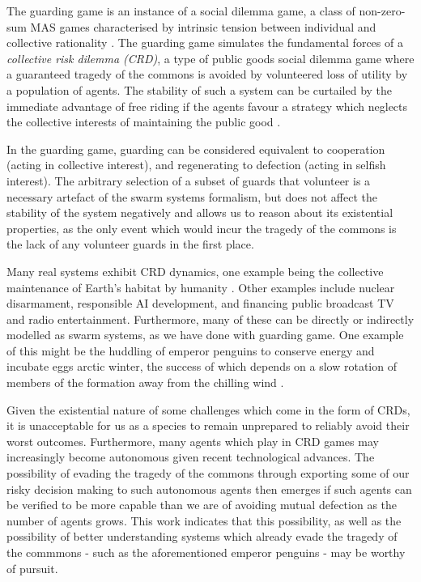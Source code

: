 The guarding game is an instance of a social dilemma game, a class of
non-zero-sum MAS games characterised by intrinsic tension between individual
and collective rationality \cite{VanlangeJPV13}. The guarding game simulates
the fundamental forces of a \emph{collective risk dilemma (CRD)}, a type of
public goods social dilemma game where a guaranteed tragedy of the commons
\cite{Hardin68} is avoided by volunteered loss of utility by a population of
agents. The stability of such a system can be curtailed by the immediate
advantage of free riding if the agents favour a strategy which neglects the
collective interests of maintaining the public good \cite{SantosP11}.

In the guarding game, guarding can be considered equivalent to cooperation
(acting in collective interest), and regenerating to defection (acting in
selfish interest). The arbitrary selection of a subset of guards that volunteer
is a necessary artefact of the swarm systems formalism, but does not affect the
stability of the system negatively and allows us to reason about its
existential properties, as the only event which would incur the tragedy of the
commons is the lack of any volunteer guards in the first place.

Many real systems exhibit CRD dynamics, one example being the collective
maintenance of Earth's habitat by humanity \cite{Smirnov19}. Other examples
include nuclear disarmament, responsible AI development, and financing public
broadcast TV and radio entertainment. Furthermore, many of these can be
directly or indirectly modelled as swarm systems, as we have done with guarding
game. One example of this might be the huddling of emperor penguins to conserve
energy and incubate eggs \cite{GilbertRLNA06}
arctic winter, the success of which depends on a slow rotation of members of
the formation away from the chilling wind \cite{WatersBK12}.

Given the existential nature of some challenges which come in the form of CRDs,
it is unacceptable for us as a species to remain unprepared to reliably avoid
their worst outcomes. Furthermore, many agents which play in CRD games may
increasingly become autonomous given recent technological advances. The
possibility of evading the tragedy of the commons through exporting some of our
risky decision making to such autonomous agents then emerges if such agents can
be verified to be more capable than we are of avoiding mutual defection as the
number of agents grows. This work indicates that this possibility, as well as
the possibility of better understanding systems which already evade the tragedy
of the commmons - such as the aforementioned emperor penguins - may be worthy
of pursuit.

